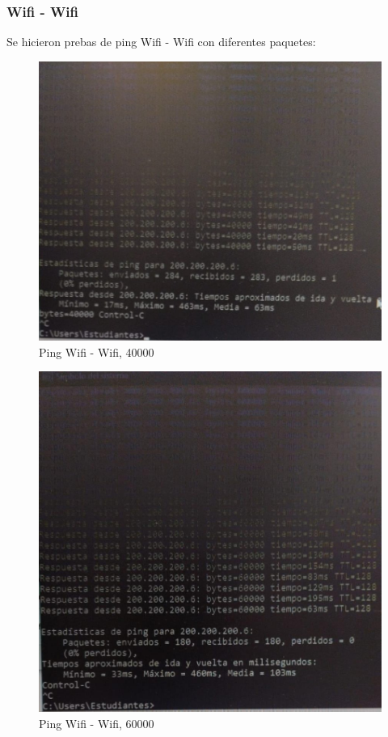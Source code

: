 \subsubsection{Wifi - Wifi}
Se hicieron prebas de ping Wifi - Wifi con diferentes paquetes:
\begin{figure}[H]
    \centering
    \includegraphics[width=0.8\columnwidth]{punto1/p1_ping_wifi_wifi_40k.jpeg}
    \caption{Ping Wifi - Wifi, 40000}
    \label{fig:ping_wifi_wifi_40k}
\end{figure}

\begin{figure}[H]
    \centering
    \includegraphics[width=0.8\columnwidth]{punto1/p1_ping_wifi_wifi_60k.jpeg}
    \caption{Ping Wifi - Wifi, 60000}
    \label{fig:ping_wifi_wifi_6k}
\end{figure}


